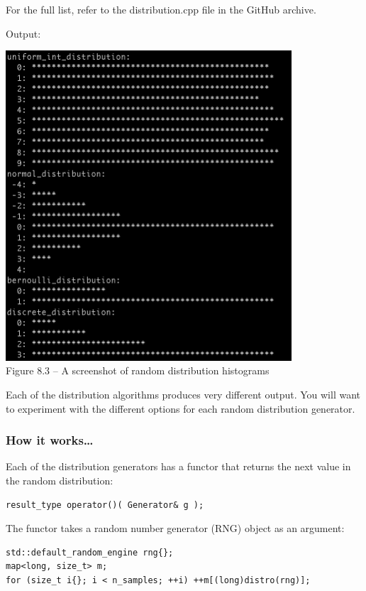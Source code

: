 \begin{itemize}
For the full list, refer to the distribution.cpp file in the GitHub archive.

Output:

\begin{center}
\includegraphics[width=0.8\textwidth]{content/chapter8/images/3.png}\\
Figure 8.3 – A screenshot of random distribution histograms
\end{center}

Each of the distribution algorithms produces very different output. You will want to experiment with the different options for each random distribution generator.

\end{itemize}

\subsubsection{How it works…}

Each of the distribution generators has a functor that returns the next value in the random distribution:

\begin{lstlisting}[style=styleCXX]
result_type operator()( Generator& g );
\end{lstlisting}

The functor takes a random number generator (RNG) object as an argument:

\begin{lstlisting}[style=styleCXX]
std::default_random_engine rng{};
map<long, size_t> m;
for (size_t i{}; i < n_samples; ++i) ++m[(long)distro(rng)];
\end{lstlisting}

